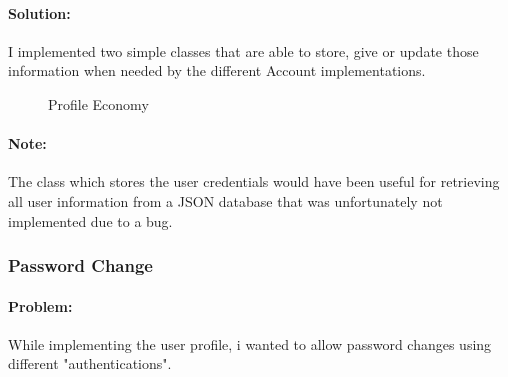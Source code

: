 \documentclass[a4paper,12pt]{report}
\begin{document}
        \paragraph{Solution:}I implemented two simple classes that are able to store, give or update those information when needed by the different Account implementations.
            \begin{figure}[H]
                \centering{}
                \caption{Profile Economy}
                \label{img:my_label}
            \end{figure}
        \paragraph{Note:}The class which stores the user credentials would have been useful for retrieving all user information from a JSON database that was unfortunately not implemented due to a bug.
        
    \subsubsection{Password Change}
        \paragraph{Problem:}While implementing the user profile, i wanted to allow password changes using different "authentications".
\end{document}
